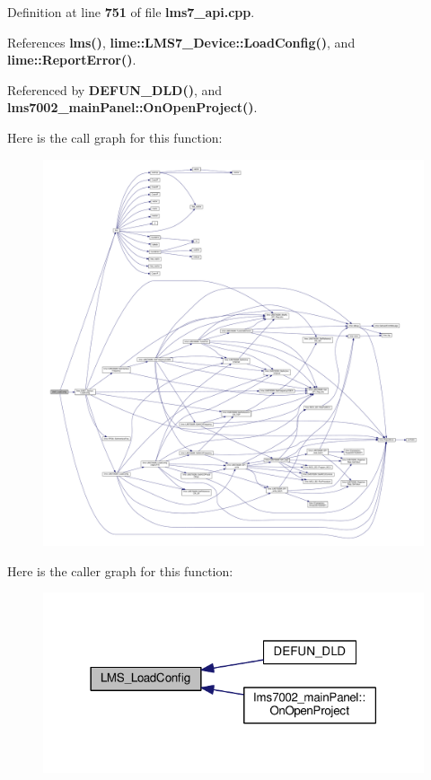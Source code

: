 Definition at line {\bf 751} of file {\bf lms7\+\_\+api.\+cpp}.



References {\bf lms()}, {\bf lime\+::\+L\+M\+S7\+\_\+\+Device\+::\+Load\+Config()}, and {\bf lime\+::\+Report\+Error()}.



Referenced by {\bf D\+E\+F\+U\+N\+\_\+\+D\+L\+D()}, and {\bf lms7002\+\_\+main\+Panel\+::\+On\+Open\+Project()}.



Here is the call graph for this function\+:
\nopagebreak
\begin{figure}[H]
\begin{center}
\leavevmode
\includegraphics[width=350pt]{df/de1/lms7__api_8cpp_a6ed2978c8a23248e27406725a293a3c3_cgraph}
\end{center}
\end{figure}




Here is the caller graph for this function\+:
\nopagebreak
\begin{figure}[H]
\begin{center}
\leavevmode
\includegraphics[width=318pt]{df/de1/lms7__api_8cpp_a6ed2978c8a23248e27406725a293a3c3_icgraph}
\end{center}
\end{figure}


